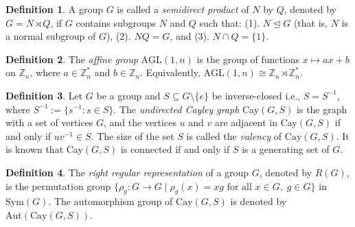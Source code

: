 \documentclass[12pt,reqno,a4paper]{amsart}
\theoremstyle{definition}
\newtheorem{defn}{Definition}[section]
\begin{document}

\begin{defn}\label{Definition 2.3}
A group $G$ is called a \emph{semidirect product} of $N$ by $Q$, 
denoted by $G = N \rtimes Q$, if $G$ contains subgroups $N$ and $Q$ such that:
(1).  $N \trianglelefteq G$ (that is, $N$ is a normal subgroup of $G$), (2). $NQ = G$, and
(3). $N \cap Q = \{1\}$.
\end{defn}

\begin{defn}\label{Definition 2.4}
The \emph{affine group} $\mathrm{AGL}(1,n)$ is the group of functions 
$x \mapsto ax+b$ on $\mathbb{Z}_n$, where $a \in \mathbb{Z}_n^{\ast}$ and 
$b \in \mathbb{Z}_n$.  Equivalently, 
$\mathrm{AGL}(1,n) \cong \mathbb{Z}_n \rtimes \mathbb{Z}_n^{\ast}$.
\end{defn}



\begin{defn}\label{Definition 2.5}
Let $G$ be a group and $S \subseteq G \setminus \{e\}$ 
be inverse-closed i.e., $S = S^{-1}$, where 
$S^{-1}:= \{s^{-1}: s \in S\}$.
The \emph{undirected Cayley graph} Cay$(G, S)$ is the graph with a set of vertices $G$, and the vertices $u$ and $v$ are adjacent in Cay$(G, S)$ if and only if $uv^{-1} \in S$. The size of the set $S$ is called the \emph{valency} of $\mathrm{Cay}(G, S)$. It is known that Cay$(G, S)$ is connected if and only if $S$ is a generating set of $G$.
\end{defn}

\begin{defn}\label{Definition 2.6}
The \emph{right regular representation} of a group $G$, denoted by $R(G)$,
is the permutation group 
$\{\rho_g : G \to G \mid \rho_g(x)=xg 
\text{ for all }
x\in G,\; g\in G\}$ in $\mathrm{Sym}(G)$.
The automorphism group of $\mathrm{Cay}(G,S)$ is denoted by
$\mathrm{Aut}(\mathrm{Cay}(G,S))$.
\end{defn}
\end{document}
